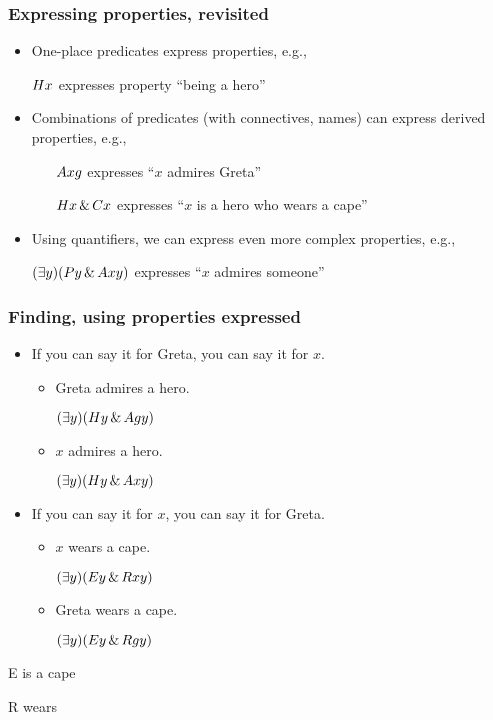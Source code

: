 \begin{frame}
  \frametitle{Expressing properties, revisited}
    \begin{itemize}[<+->]
      \item One-place predicates express properties, e.g.,
      \item[] $Hx$ expresses property ``being a hero''
      \item Combinations of predicates (with connectives, names) can
      express derived properties, e.g.,
      \begin{itemize}[<+->]
        \item[] $Axg$ expresses ``$x$ admires Greta''
        \item[] $Hx \,\&\, Cx$ expresses ``$x$ is a hero who wears a cape''
      \end{itemize}
    \item Using quantifiers, we can express even more complex
    properties, e.g.,
    \item[] $(\exists y)(Py \,\&\, Axy)$ expresses ``$x$ admires someone''
    \end{itemize}
  \end{frame}
  
  \begin{frame}
    \frametitle{Finding, using properties expressed}
  
  \begin{itemize}[<+->]
    \item If you can say it for Greta, you can say it for $x$.
    \begin{itemize}[<+->]
      \item Greta admires a hero.
      \item[] \alert{$(\exists y)(Hy \,\&\, Agy)$}
      \item $x$ admires a hero.
      \item[] \alert{$(\exists y)(Hy \,\&\, Axy)$}
    \end{itemize}
    \item If you can say it for $x$, you can say it for Greta.
    \begin{itemize}[<+->]
      \item $x$ wears a cape.
      \item[] \alert{$(\exists y)(Ey \,\&\, Rxy)$}
      \item Greta wears a cape.
      \item[] \alert{$(\exists y)(Ey \,\&\, Rgy)$}
    \end{itemize}
  \end{itemize}
  \begin{ekey}\scriptsize
    \item[E\qv{x}]  is a cape
    \item[R\qr{x}{y}]  wears 
  \end{ekey}
  \end{frame}
  
